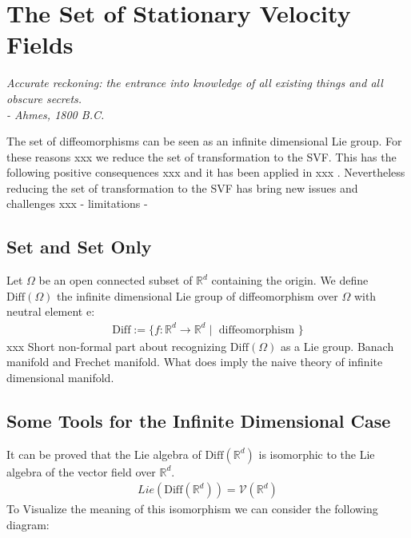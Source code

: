 
\chapter{The Set of Stationary Velocity Fields}\label{ch:svf}

\begin{flushright}
	\emph{Accurate reckoning: the entrance into knowledge of all existing things and all obscure secrets.\\
		- Ahmes, 1800 B.C.}
\end{flushright}

The set of diffeomorphisms can be seen as an infinite dimensional Lie group. For these reasons xxx we reduce the set of transformation to the SVF. This has the following positive consequences xxx and it has been applied in xxx . Nevertheless reducing the set of transformation to the SVF has bring new issues and challenges xxx - limitations - 

\section{Set and Set Only}\label{se:svf_set}
Let $\Omega$ be an open connected subset of $\mathbb{R}^d$ containing the origin.  We define $\text{Diff}(\Omega)$ the infinite dimensional Lie group of diffeomorphism over $\Omega$ with neutral element $\text{e}$:
\begin{align*}
\text{Diff}:= \lbrace f:\mathbb{R}^d \longrightarrow \mathbb{R}^d \mid \text{ diffeomorphism } \rbrace
\end{align*}
xxx Short non-formal part about recognizing $\text{Diff}(\Omega)$ as a Lie group. Banach manifold and Frechet manifold. What does imply the naive theory of infinite dimensional manifold.



\section{Some Tools for the Infinite Dimensional Case}

It can be proved that the Lie algebra of $\text{Diff}(\mathbb{R}^{d})$ is isomorphic to the Lie algebra of the vector field over $\mathbb{R}^{d}$.
\begin{align}\label{eq:mainaimliealgebra}
Lie(\text{Diff}(\mathbb{R}^{d})) = \mathcal{V}(\mathbb{R}^{d})
\end{align}
To Visualize the meaning of this isomorphism we can consider the following diagram:


